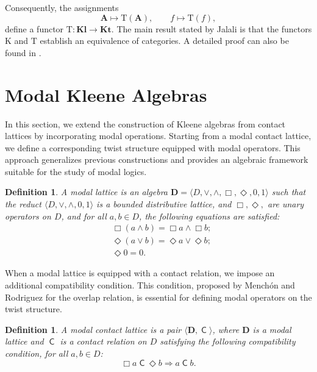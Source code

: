 \documentclass[10pt,a4paper]{amsart}
\newtheorem{definition}[theorem]{Definition}
\DeclareMathOperator{\con}{\mathsf{C}}
\newcommand{\A}{\mathbf{A}}
\newcommand{\D}{\mathbf{D}}
\begin{document}
Consequently, the assignments
\[
\A\mapsto\mathrm{T}(\A),
\qquad
f\mapsto\mathrm{T}(f),
\]
define a functor $\mathrm{T}:\mathbf{Kl}\to\mathbf{Kt}$. The main result stated by Jalali \cite{jalali} is that the functors $\mathrm{K}$ and $\mathrm{T}$ establish an equivalence of categories. A detailed proof can also be found in \cite{viglizzo99algebras}.

\section{Modal Kleene Algebras}
\label{sec:modal}

In this section, we extend the construction of Kleene algebras from contact lattices by incorporating modal operations. Starting from a modal contact lattice, we define a corresponding twist structure equipped with modal operators. This approach generalizes previous constructions and provides an algebraic framework suitable for the study of modal logics.

\begin{definition}
    A \emph{modal lattice} is an algebra $\D=\langle D, \vee, \wedge,\Box, \Diamond, 0,1\rangle$ such that the reduct $\langle D, \vee, \wedge, 0,1\rangle$ is a bounded distributive lattice, and $\Box, \Diamond,$ are unary operators on $D$, and for all $a, b\in D$, the following equations are satisﬁed:
    \begin{align}
        \label{ml1}
        &\Box(a \wedge b) = \Box a \wedge \Box b;  \tag{ML1}\\
        \label{ml2}
        &\Diamond(a \vee b) = \Diamond a \vee \Diamond b; \tag{ML2}\\
        \label{ml3}
        &\Diamond 0=0. \tag{ML3}
    \end{align}
\end{definition}

When a modal lattice is equipped with a contact relation, we impose an additional compatibility condition. This condition, proposed by Menchón and Rodriguez \cite{Menchon2025} for the overlap relation, is essential for defining modal operators on the twist structure.

\begin{definition}
A \emph{modal contact lattice} is a pair $\langle \D,\con\rangle$, where $\D$ is a modal lattice and $\con$ is a contact relation on $D$ satisfying the following compatibility condition, for all $a,b\in D$:
\begin{equation}
\label{ax:modal-contact}\tag{MCL}
\Box a \con \Diamond b \Longrightarrow a \con b.
\end{equation}
\end{definition}
\end{document}

